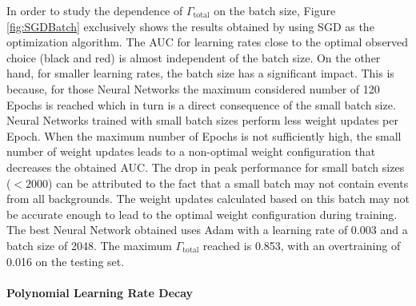In order to study the dependence of $\Gamma_{\text{total}}$ on the batch size, Figure \ref{fig:SGDBatch} exclusively shows the results obtained by using SGD as the optimization algorithm. The AUC for learning rates close to the optimal observed choice (black and red) is almost independent of the batch size. On the other hand, for smaller learning rates, the batch size has a significant impact. This is because, for those Neural Networks the maximum considered number of 120 Epochs is reached which in turn is a direct consequence of the small batch size. Neural Networks trained with small batch sizes perform less weight updates per Epoch. When the maximum number of Epochs is not sufficiently high, the small number of weight updates leads to a non-optimal weight configuration that decreases the obtained AUC. The drop in peak performance for small batch sizes ($< 2000$) can be attributed to the fact that a small batch may not contain events from all backgrounds. The weight updates calculated based on this batch may not be accurate enough to lead to the optimal weight configuration during training. \\
The best Neural Network obtained uses Adam with a learning rate of 0.003 and a batch size of 2048.  The maximum  $\Gamma_{\text{total}}$ reached is 0.853, with an overtraining of 0.016 on the testing set.




\paragraph{Polynomial Learning Rate Decay} \mbox{} \\
 

